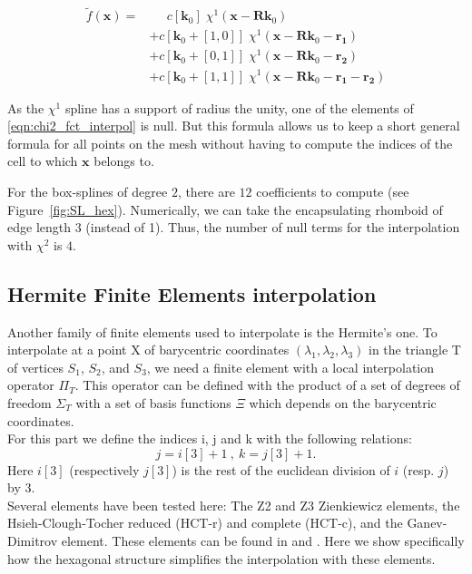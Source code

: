 \documentclass[proc]{edpsmath}
\begin{document}
\begin{align}
\label{eqn:chi2_fct_interpol}
\tilde{f}(\mathbf{x}) =& \;\;\;\;\; c[\mathbf{k}_0] \; \chi^1(\mathbf{x} - \mathbf{R}\mathbf{k}_0) \nonumber\\
	&+ c[\mathbf{k}_0 +[1,0]]\; \chi^1(\mathbf{x} - \mathbf{R}\mathbf{k}_0 - \mathbf{r_1}) \nonumber\\
	&+ c[\mathbf{k}_0 +[0,1]]\; \chi^1(\mathbf{x} - \mathbf{R}\mathbf{k}_0 - \mathbf{r_2}) \nonumber\\
	&+ c[\mathbf{k}_0 +[1,1]]\; \chi^1(\mathbf{x} - \mathbf{R}\mathbf{k}_0 - \mathbf{r_1} - \mathbf{r_2})
\end{align}

\rmrk  As the $\chi^1$ spline has a support of radius the unity, one of the elements of \eqref{eqn:chi2_fct_interpol} is null. But this formula allows us to keep a short general formula for all points on the mesh without having to compute the indices of the cell to which $\mathbf{x}$ belongs to.

\rmrk For the box-splines of degree $2$, there are $12$ coefficients to compute (see Figure~\ref{fig:SL_hex}). Numerically, we can take the encapsulating rhomboid of edge length $3$ (instead of 1). Thus, the number of null terms for the interpolation with $\chi^2$ is $4$.


\subsection{Hermite Finite Elements interpolation}

Another family of finite elements used to interpolate is the Hermite's one.
To interpolate at a point X of barycentric coordinates $(\lambda_1,\lambda_2,\lambda_3)$ in the triangle T of vertices $S_1$, $S_2$, and $S_3$, we need a finite element with a local interpolation operator $\Pi_T $. This operator can be defined with the product of a set of degrees of freedom $\Sigma_T$ with a set of basis functions $\Xi$ which depends on the barycentric coordinates.\\
For this part we define the indices i, j and k with the following relations:
\begin{equation*}
j=i[3]+1 ~,~ k=j[3]+1.
\end{equation*}  
Here $i[3]$ (respectively $j[3]$) is the rest of the euclidean division of $i$ (resp. $j$) by $3$.\\

Several elements have been tested here:
The Z2 and Z3 Zienkiewicz elements, the Hsieh-Clough-Tocher reduced (HCT-r) and complete (HCT-c), and the Ganev-Dimitrov element. These elements can be found in \cite{z} and \cite{b1} . Here we show specifically how the hexagonal structure simplifies the interpolation with these elements.\\
\end{document}
